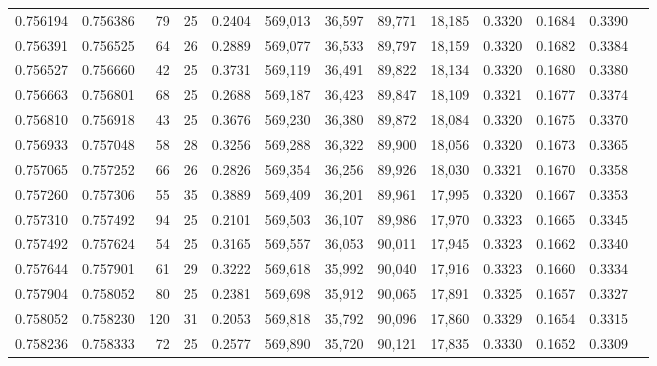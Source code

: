\begin{tabular}{rrrrrrrrrrrrr}
0.756194 & 0.756386 &    79 &  25 &                                     0.2404 & 569,013 &  36,597 &  89,771 &  18,185 & 0.3320 & 0.1684 & 0.3390 \\
0.756391 & 0.756525 &    64 &  26 &                                     0.2889 & 569,077 &  36,533 &  89,797 &  18,159 & 0.3320 & 0.1682 & 0.3384 \\
0.756527 & 0.756660 &    42 &  25 &                                     0.3731 & 569,119 &  36,491 &  89,822 &  18,134 & 0.3320 & 0.1680 & 0.3380 \\
0.756663 & 0.756801 &    68 &  25 &                                     0.2688 & 569,187 &  36,423 &  89,847 &  18,109 & 0.3321 & 0.1677 & 0.3374 \\
0.756810 & 0.756918 &    43 &  25 &                                     0.3676 & 569,230 &  36,380 &  89,872 &  18,084 & 0.3320 & 0.1675 & 0.3370 \\
0.756933 & 0.757048 &    58 &  28 &                                     0.3256 & 569,288 &  36,322 &  89,900 &  18,056 & 0.3320 & 0.1673 & 0.3365 \\
0.757065 & 0.757252 &    66 &  26 &                                     0.2826 & 569,354 &  36,256 &  89,926 &  18,030 & 0.3321 & 0.1670 & 0.3358 \\
0.757260 & 0.757306 &    55 &  35 &                                     0.3889 & 569,409 &  36,201 &  89,961 &  17,995 & 0.3320 & 0.1667 & 0.3353 \\
0.757310 & 0.757492 &    94 &  25 &                                     0.2101 & 569,503 &  36,107 &  89,986 &  17,970 & 0.3323 & 0.1665 & 0.3345 \\
0.757492 & 0.757624 &    54 &  25 &                                     0.3165 & 569,557 &  36,053 &  90,011 &  17,945 & 0.3323 & 0.1662 & 0.3340 \\
0.757644 & 0.757901 &    61 &  29 &                                     0.3222 & 569,618 &  35,992 &  90,040 &  17,916 & 0.3323 & 0.1660 & 0.3334 \\
0.757904 & 0.758052 &    80 &  25 &                                     0.2381 & 569,698 &  35,912 &  90,065 &  17,891 & 0.3325 & 0.1657 & 0.3327 \\
0.758052 & 0.758230 &   120 &  31 &                                     0.2053 & 569,818 &  35,792 &  90,096 &  17,860 & 0.3329 & 0.1654 & 0.3315 \\
0.758236 & 0.758333 &    72 &  25 &                                     0.2577 & 569,890 &  35,720 &  90,121 &  17,835 & 0.3330 & 0.1652 & 0.3309 \\

\end{tabular}
